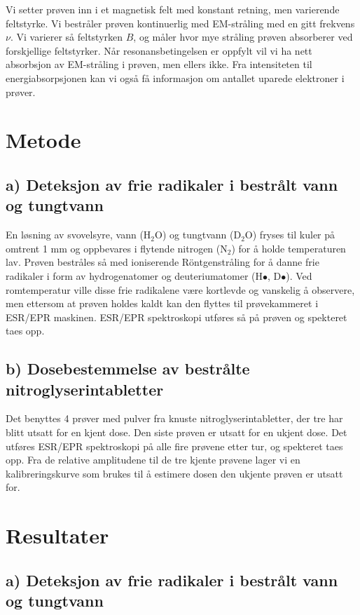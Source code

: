 \documentclass[a4paper, 11pt, notitlepage]{article}
\begin{document}
Vi setter prøven inn i et magnetisk felt med konstant retning, men varierende feltstyrke. Vi bestråler prøven kontinuerlig med EM-stråling med en gitt frekvens $\nu$. Vi varierer så feltstyrken $B$, og måler hvor mye stråling prøven absorberer ved forskjellige feltstyrker. Når resonansbetingelsen er oppfylt vil vi ha nett absorbsjon av EM-stråling i prøven, men ellers ikke. Fra intensiteten til energiabsorpsjonen kan vi også få informasjon om antallet uparede elektroner i prøver.

\section{Metode}
\subsection{a) Deteksjon av frie radikaler i bestrålt vann og tungtvann}
En løsning av svovelsyre, vann (H$_2$O) og tungtvann (D$_2$O) fryses til kuler på omtrent 1 mm og oppbevares i flytende nitrogen (N$_2$) for å holde temperaturen lav. Prøven bestråles så med ioniserende Röntgenstråling for å danne frie radikaler i form av hydrogenatomer og deuteriumatomer (H$\bullet$, D$\bullet$). Ved romtemperatur ville disse frie radikalene være kortlevde og vanskelig å observere, men ettersom at prøven holdes kaldt kan den flyttes til prøvekammeret i ESR/EPR maskinen. ESR/EPR spektroskopi utføres så på prøven og spekteret taes opp.

\subsection{b) Dosebestemmelse av bestrålte nitroglyserintabletter}
Det benyttes 4 prøver med pulver fra knuste nitroglyserintabletter, der tre har blitt utsatt for en kjent dose. Den siste prøven er utsatt for en ukjent dose. Det utføres ESR/EPR spektroskopi på alle fire prøvene etter tur, og spekteret taes opp. Fra de relative amplitudene til de tre kjente prøvene lager vi en kalibreringskurve som brukes til å estimere dosen den ukjente prøven er utsatt for.

\section{Resultater}

\subsection{a) Deteksjon av frie radikaler i bestrålt vann og tungtvann}
\end{document}
